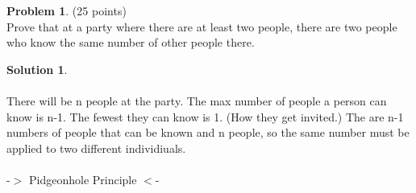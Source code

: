 \documentclass{article}
\theoremstyle{definition}
\newtheorem{problem}{Problem}
\newtheorem*{solution}{Solution}
\begin{document}
\newpage

\begin{problem} (25 points)\\
Prove that at a party where there are at least two people, there are two people who know the same number of other people there.
\end{problem}

\begin{solution}\ \\ 
\ \\
There will be n people at the party. The max number of people a person can know is n-1. The fewest they can know is 1. (How they get invited.) The are n-1 numbers of people that can be known and n people, so the same number must be applied to two different individiuals.\ \\ 
\ \\
-$>$ Pidgeonhole Principle $<$-
\end{solution}
\end{document}
